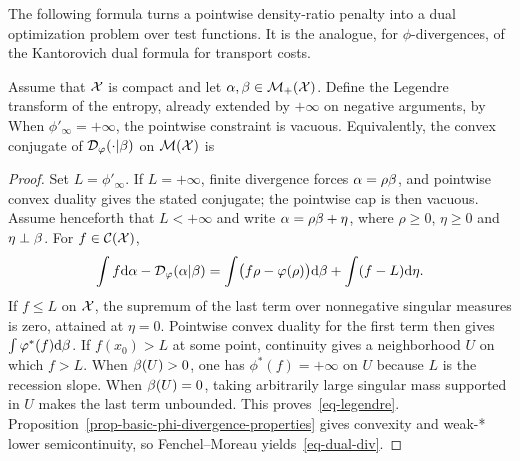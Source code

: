 The following formula turns a pointwise density-ratio penalty into a dual optimization problem over test functions. It is the analogue, for $\phi$-divergences, of the Kantorovich dual formula for transport costs.

\begin{proposition}\label{prop-phi-div-dual}
	Assume that $\mathcal{X}$ is compact and let $\alpha,\beta\in\mathcal{M}_+(\mathcal{X})$. Define the Legendre transform of the entropy, already extended by $+\infty$ on negative arguments, by
	When $\phi'_\infty=+\infty$, the pointwise constraint is vacuous.
	Equivalently, the convex conjugate of $\mathcal{D}_\varphi(\cdot|\beta)$ on $\mathcal{M}(\mathcal{X})$ is
\end{proposition}

\begin{proof}
	Set $L=\phi'_\infty$. If $L=+\infty$, finite divergence forces $\alpha=\rho\beta$, and pointwise convex duality gives the stated conjugate; the pointwise cap is then vacuous. Assume henceforth that $L<+\infty$ and write $\alpha=\rho\beta+\eta$, where $\rho\geq0$, $\eta\geq0$ and $\eta\perp\beta$. For $f\in\mathcal{C}(\mathcal{X})$,
	\[
		\int f\mathrm{d}\alpha-\mathcal{D}_\varphi(\alpha|\beta)
		=
		\int\bigl(f\rho-\varphi(\rho)\bigr)\mathrm{d}\beta
		+
		\int(f-L)\mathrm{d}\eta.
	\]
	If $f\leq L$ on $\mathcal{X}$, the supremum of the last term over nonnegative singular measures is zero, attained at $\eta=0$. Pointwise convex duality for the first term then gives $\int\varphi^*(f)\mathrm{d}\beta$. If $f(x_0)>L$ at some point, continuity gives a neighborhood $U$ on which $f>L$. When $\beta(U)>0$, one has $\phi^*(f)=+\infty$ on $U$ because $L$ is the recession slope. When $\beta(U)=0$, taking arbitrarily large singular mass supported in $U$ makes the last term unbounded. This proves~\eqref{eq-legendre}. Proposition~\ref{prop-basic-phi-divergence-properties} gives convexity and weak-* lower semicontinuity, so Fenchel--Moreau yields~\eqref{eq-dual-div}.
\end{proof}


